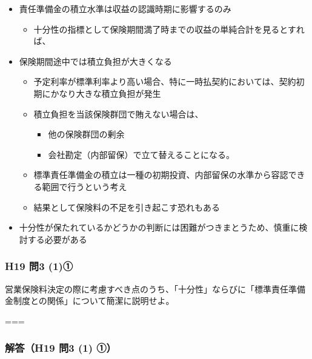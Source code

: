 \documentclass[
]{article}
\providecommand{\tightlist}{%
  \setlength{\itemsep}{0pt}\setlength{\parskip}{0pt}}
\begin{document}
\begin{enumerate}
\begin{itemize}
    \begin{itemize}
    \tightlist
    \item
      責任準備金の積立水準は収益の認識時期に影響するのみ

      \begin{itemize}
      \tightlist
      \item
        十分性の指標として保険期間満了時までの収益の単純合計を見るとすれば、
      \end{itemize}
    \item
      保険期間途中では積立負担が大きくなる

      \begin{itemize}
      \tightlist
      \item
        予定利率が標準利率より高い場合、特に一時払契約においては、契約初期にかなり大きな積立負担が発生
      \item
        積立負担を当該保険群団で賄えない場合は、

        \begin{itemize}
        \tightlist
        \item
          他の保険群団の剰余
        \item
          会社勘定（内部留保）で立て替えることになる。
        \end{itemize}
      \item
        標準責任準備金の積立は一種の初期投資、内部留保の水準から容認できる範囲で行うという考え
      \item
        結果として保険料の不足を引き起こす恐れもある
      \end{itemize}
    \item
      十分性が保たれているかどうかの判断には困難がつきまとうため、慎重に検討する必要がある
    \end{itemize}
  \end{itemize}
\end{enumerate}

\hypertarget{h19-ux554f3-1ux2460}{%
\subsubsection{H19 問3 (1)①}\label{h19-ux554f3-1ux2460}}

営業保険料決定の際に考慮すべき点のうち、「十分性」ならびに「標準責任準備金制度との関係」について簡潔に説明せよ。

===

\hypertarget{ux89e3ux7b54h19-ux554f3-1-ux2460}{%
\subsubsection{解答（H19 問3 (1)
①）}\label{ux89e3ux7b54h19-ux554f3-1-ux2460}}
\end{document}
